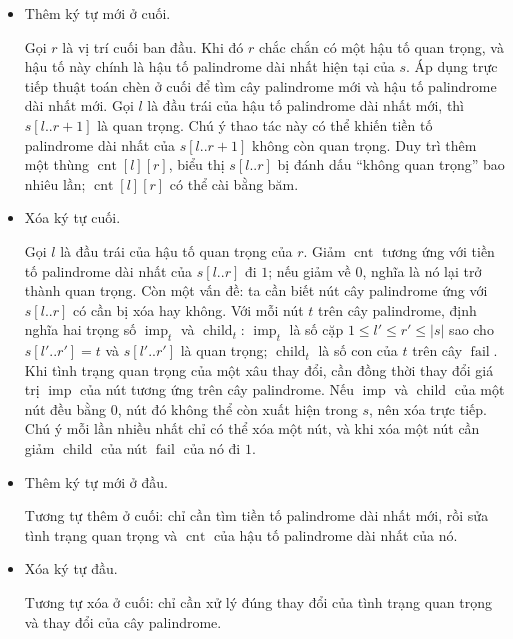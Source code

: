 \documentclass[11pt]{article}
\begin{document}
\begin{itemize}
  \item Thêm ký tự mới ở cuối.

  Gọi \(r\) là vị trí cuối ban đầu. Khi đó \(r\) chắc chắn có một hậu tố quan
  trọng, và hậu tố này chính là hậu tố palindrome dài nhất hiện tại của \(s\).
  Áp dụng trực tiếp thuật toán chèn ở cuối để tìm cây palindrome mới và hậu tố
  palindrome dài nhất mới. Gọi \(l\) là đầu trái của hậu tố palindrome dài
  nhất mới, thì \(s[l..r+1]\) là quan trọng. Chú ý thao tác này có thể khiến
  tiền tố palindrome dài nhất của \(s[l..r+1]\) không còn quan trọng. Duy trì
  thêm một thùng \(\operatorname{cnt}[l][r]\), biểu thị \(s[l..r]\) bị đánh
  dấu ``không quan trọng'' bao nhiêu lần; \(\operatorname{cnt}[l][r]\) có thể
  cài bằng băm.

  \item Xóa ký tự cuối.

  Gọi \(l\) là đầu trái của hậu tố quan trọng của \(r\). Giảm
  \(\operatorname{cnt}\) tương ứng với tiền tố palindrome dài nhất của
  \(s[l..r]\) đi \(1\); nếu giảm về \(0\), nghĩa là nó lại trở thành quan
  trọng. Còn một vấn đề: ta cần biết nút cây palindrome ứng với \(s[l..r]\) có
  cần bị xóa hay không. Với mỗi nút \(t\) trên cây palindrome, định nghĩa hai
  trọng số \(\operatorname{imp}_t\) và \(\operatorname{child}_t\):
  \(\operatorname{imp}_t\) là số cặp \(1\le l'\le r'\le |s|\) sao cho
  \(s[l'..r']=t\) và \(s[l'..r']\) là quan trọng;
  \(\operatorname{child}_t\) là số con của \(t\) trên cây
  \(\operatorname{fail}\). Khi tình trạng quan trọng của một xâu thay đổi, cần
  đồng thời thay đổi giá trị \(\operatorname{imp}\) của nút tương ứng trên cây
  palindrome. Nếu \(\operatorname{imp}\) và \(\operatorname{child}\) của một
  nút đều bằng \(0\), nút đó không thể còn xuất hiện trong \(s\), nên xóa trực
  tiếp. Chú ý mỗi lần nhiều nhất chỉ có thể xóa một nút, và khi xóa một nút
  cần giảm \(\operatorname{child}\) của nút \(\operatorname{fail}\) của nó đi
  \(1\).

  \item Thêm ký tự mới ở đầu.

  Tương tự thêm ở cuối: chỉ cần tìm tiền tố palindrome dài nhất mới, rồi sửa
  tình trạng quan trọng và \(\operatorname{cnt}\) của hậu tố palindrome dài
  nhất của nó.

  \item Xóa ký tự đầu.

  Tương tự xóa ở cuối: chỉ cần xử lý đúng thay đổi của tình trạng quan trọng
  và thay đổi của cây palindrome.
\end{itemize}
\end{document}
